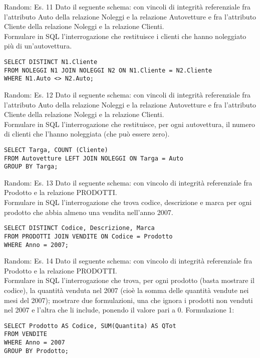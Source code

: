 %
\begin{frame}[fragile]{Random: Es. 11}
Dato il seguente schema:
\schemaClientiNoleggiAuto
con vincoli di integrit\`a referenziale fra l'attributo Auto della relazione Noleggi e la relazione Autovetture e fra l'attributo Cliente della relazione Noleggi e la relazione Clienti.
\newline
\\Formulare in SQL l'interrogazione che restituisce i clienti che hanno noleggiato pi\`u di un'autovettura.
\pause
\begin{lstlisting}   
SELECT DISTINCT N1.Cliente
FROM NOLEGGI N1 JOIN NOLEGGI N2 ON N1.Cliente = N2.Cliente
WHERE N1.Auto <> N2.Auto;
\end{lstlisting}
\end{frame}
%
\begin{frame}[fragile]{Random: Es. 12}
Dato il seguente schema:
\schemaClientiNoleggiAuto
con vincoli di integrit\`a referenziale fra l'attributo Auto della relazione Noleggi e la relazione Autovetture e fra l'attributo Cliente della relazione Noleggi e la relazione Clienti.
\newline
\\Formulare in SQL l'interrogazione che restituisce, per ogni autovettura, il numero di clienti che l'hanno noleggiata (che pu\`o essere zero).
\pause
\begin{lstlisting}   
SELECT Targa, COUNT (Cliente)
FROM Autovetture LEFT JOIN NOLEGGI ON Targa = Auto
GROUP BY Targa;    
\end{lstlisting}
\end{frame}
%
\begin{frame}[fragile]{Random: Es. 13}
Dato il seguente schema:
\schemaProdottiVendite
con vincolo di integrit\`a referenziale fra Prodotto e la relazione PRODOTTI.
\newline
\\Formulare in SQL l'interrogazione che trova codice, descrizione e marca per ogni prodotto che abbia almeno una vendita nell'anno 2007.
\pause
\begin{lstlisting}   
SELECT DISTINCT Codice, Descrizione, Marca
FROM PRODOTTI JOIN VENDITE ON Codice = Prodotto
WHERE Anno = 2007;
\end{lstlisting}
\end{frame}
%
\begin{frame}[fragile]{Random: Es. 14}
Dato il seguente schema:
\schemaProdottiVendite
con vincolo di integrit\`a referenziale fra Prodotto e la relazione PRODOTTI.
\newline
\\Formulare in SQL l'interrogazione che trova, per ogni prodotto (basta mostrare il codice), la quantit\`a venduta nel 2007 (cio\`e la somma delle quantit\`a vendute nei mesi del 2007); mostrare due formulazioni, una che ignora i prodotti non venduti nel 2007 e l'altra che li include, ponendo il valore pari a 0.
\pause
Formulazione 1:
\begin{lstlisting}   
SELECT Prodotto AS Codice, SUM(Quantita) AS QTot
FROM VENDITE
WHERE Anno = 2007
GROUP BY Prodotto;
\end{lstlisting}
\end{frame}
